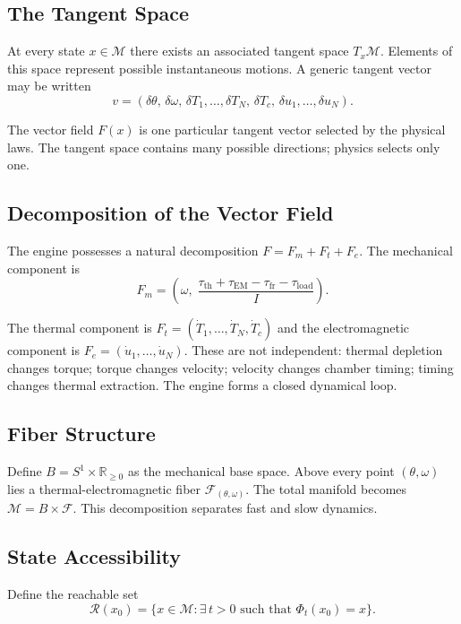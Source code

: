 \documentclass[12pt,a4paper]{article}
\newcommand{\M}{\mathcal{M}}
\begin{document}
\subsection{The Tangent Space}

At every state $x \in \M$ there exists an associated tangent space $T_x\M$. Elements of this space represent possible instantaneous motions. A generic tangent vector may be written
\[
v = (\delta\theta,\, \delta\omega,\, \delta T_1, \ldots, \delta T_N,\, \delta T_c,\, \delta u_1, \ldots, \delta u_N).
\]

The vector field $F(x)$ is one particular tangent vector selected by the physical laws. The tangent space contains many possible directions; physics selects only one.

\subsection{Decomposition of the Vector Field}

The engine possesses a natural decomposition $F = F_m + F_t + F_e$. The mechanical component is
\[
F_m = \left(\omega,\; \frac{\tau_{\mathrm{th}} + \tau_{\mathrm{EM}} - \tau_{\mathrm{fr}} - \tau_{\mathrm{load}}}{I}\right).
\]

The thermal component is $F_t = (\dot T_1, \ldots, \dot T_N, \dot T_c)$ and the electromagnetic component is $F_e = (\dot u_1, \ldots, \dot u_N)$. These are not independent: thermal depletion changes torque; torque changes velocity; velocity changes chamber timing; timing changes thermal extraction. The engine forms a closed dynamical loop.

\subsection{Fiber Structure}

Define $B = S^1 \times \mathbb{R}_{\ge 0}$ as the mechanical base space. Above every point $(\theta, \omega)$ lies a thermal-electromagnetic fiber $\mathcal{F}_{(\theta,\omega)}$. The total manifold becomes $\M = B \times \mathcal{F}$. This decomposition separates fast and slow dynamics.

\subsection{State Accessibility}

Define the reachable set
\[
\mathcal{R}(x_0) = \bigl\{ x \in \M : \exists\, t > 0 \text{ such that } \Phi_t(x_0) = x \bigr\}.
\]
\end{document}
